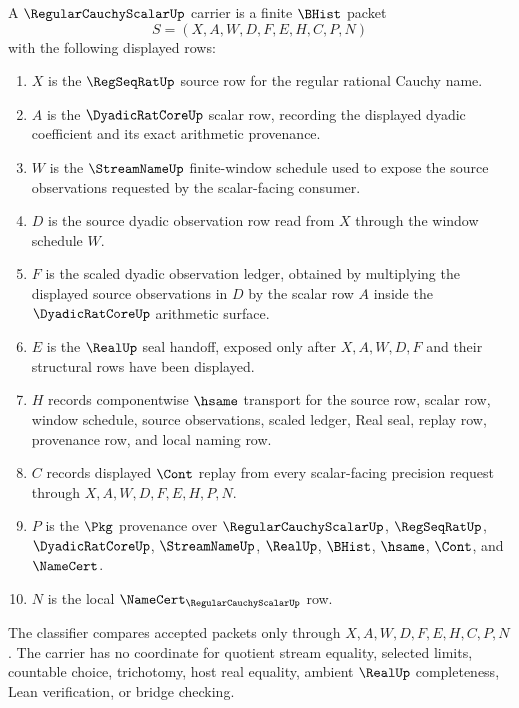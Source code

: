 \begin{definition}
\label{def:regular-cauchy-scalar-carrier}
A $\RegularCauchyScalarUp$ carrier is a finite $\BHist$ packet
$$
S=(X,A,W,D,F,E,H,C,P,N)
$$
with the following displayed rows:
\begin{enumerate}
\item $X$ is the $\RegSeqRatUp$ source row for the regular rational Cauchy name.
\item $A$ is the $\DyadicRatCoreUp$ scalar row, recording the displayed dyadic coefficient and its exact arithmetic provenance.
\item $W$ is the $\StreamNameUp$ finite-window schedule used to expose the source observations requested by the scalar-facing consumer.
\item $D$ is the source dyadic observation row read from $X$ through the window schedule $W$.
\item $F$ is the scaled dyadic observation ledger, obtained by multiplying the displayed source observations in $D$ by the scalar row $A$ inside the $\DyadicRatCoreUp$ arithmetic surface.
\item $E$ is the $\RealUp$ seal handoff, exposed only after $X,A,W,D,F$ and their structural rows have been displayed.
\item $H$ records componentwise $\hsame$ transport for the source row, scalar row, window schedule, source observations, scaled ledger, Real seal, replay row, provenance row, and local naming row.
\item $C$ records displayed $\Cont$ replay from every scalar-facing precision request through $X,A,W,D,F,E,H,P,N$.
\item $P$ is the $\Pkg$ provenance over $\RegularCauchyScalarUp$, $\RegSeqRatUp$, $\DyadicRatCoreUp$, $\StreamNameUp$, $\RealUp$, $\BHist$, $\hsame$, $\Cont$, and $\NameCert$.
\item $N$ is the local $\NameCert_{\RegularCauchyScalarUp}$ row.
\end{enumerate}
The classifier compares accepted packets only through $X,A,W,D,F,E,H,C,P,N$. The carrier has no coordinate for quotient stream equality, selected limits, countable choice, trichotomy, host real equality, ambient $\RealUp$ completeness, Lean verification, or bridge checking.
\end{definition}

